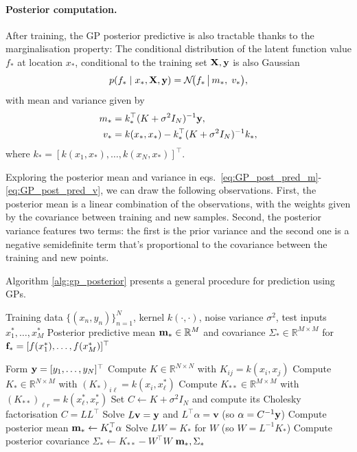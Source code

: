 \paragraph{Posterior computation.} After training, the GP posterior predictive is also tractable thanks to  the marginalisation property: The conditional distribution of the latent function value \(f_\ast\) at location \(x_\ast\), conditional to the training set \({ \mathbf{X}}, { \mathbf{y}}\) is also Gaussian
\[
p(f_\ast \mid x_\ast,{ \mathbf{X}},{ \mathbf{y}})
= \mathcal N\!\bigl(f_\ast \,\big|\, m_\ast,\; v_\ast \bigr),
\]
with mean and variance given by
\begin{align}
    m_\ast &= k_\ast^\top (K+\sigma^2 I_N)^{-1}{ \mathbf{y}},\label{eq:GP_post_pred_m}\\
v_\ast &= k(x_\ast,x_\ast) - k_\ast^\top (K+\sigma^2 I_N)^{-1}k_\ast,\label{eq:GP_post_pred_v}
\end{align}
where \(k_\ast = [k(x_1,x_\ast),\ldots,k(x_N,x_\ast)]^\top\).

Exploring the posterior mean and variance in eqs.~\eqref{eq:GP_post_pred_m}-\eqref{eq:GP_post_pred_v}, we can draw the following observations. First, the posterior mean is a linear combination of the observations, with the weights given by the covariance between training and new samples. Second, the posterior variance features two terms: the first is the prior variance and the second one is a negative semidefinite term that's proportional to the covariance between the training and new points.  

Algorithm \ref{alg:gp_posterior} presents a general procedure for prediction using GPs.  

\begin{algorithm}[H]
\caption{Posterior Prediction in Gaussian Process Regression}
\label{alg:gp_posterior}
\begin{algorithmic}[1]
\Require Training data \(\{(x_n,y_n)\}_{n=1}^N\), kernel \(k(\cdot,\cdot)\), noise variance \(\sigma^2\), test inputs \(x^\ast_1,\ldots,x^\ast_M\)
\Ensure Posterior predictive mean \({ \mathbf{m}}_\ast\in\mathbb R^M\) and covariance \(\Sigma_\ast\in\mathbb R^{M\times M}\) for \({ \mathbf{f}}_\ast=[f(x^\ast_1),\ldots,f(x^\ast_M)]^\top\)

\State Form \({ \mathbf{y}}=[y_1,\ldots,y_N]^\top\)
\State Compute \(K\in\mathbb R^{N\times N}\) with \(K_{ij}=k(x_i,x_j)\)
\State Compute \(K_\ast\in\mathbb R^{N\times M}\) with \((K_\ast)_{i\ell}=k(x_i,x^\ast_\ell)\)
\State Compute \(K_{\ast\ast}\in\mathbb R^{M\times M}\) with \((K_{\ast\ast})_{\ell r}=k(x^\ast_\ell,x^\ast_r)\)
\State Set \(C \gets K+\sigma^2 I_N\) and compute its Cholesky factorisation \(C=LL^\top\)
\State Solve \(L\mathbf{v}={ \mathbf{y}}\) and \(L^\top \alpha=\mathbf{v}\) \hfill (so \(\alpha=C^{-1}{ \mathbf{y}}\))
\State Compute posterior mean \({ \mathbf{m}}_\ast \gets K_\ast^\top \alpha\)
\State Solve \(LW=K_\ast\) for \(W\) \hfill (so \(W=L^{-1}K_\ast\))
\State Compute posterior covariance \(\Sigma_\ast \gets K_{\ast\ast}-W^\top W\)
\State \Return \({ \mathbf{m}}_\ast,\Sigma_\ast\)
\end{algorithmic}
\end{algorithm}

